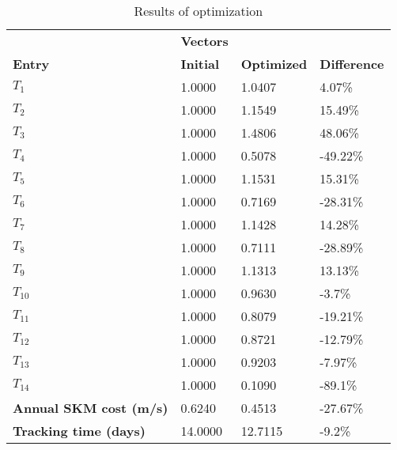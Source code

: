 \begin{table}[H]
\centering
\begin{tabular}{llll}
\textbf{}      & \cellcolor[HTML]{EFEFEF}\textbf{Vectors} & \textbf{} & \textbf{}         \\
\rowcolor[HTML]{EFEFEF} 
\textbf{Entry} & \textbf{Initial} & \textbf{Optimized} & \textbf{Difference} \\
$T_1$ & 1.0000 & 1.0407 & 4.07\% \\ 
$T_2$ & 1.0000 & 1.1549 & 15.49\% \\ 
$T_3$ & 1.0000 & 1.4806 & 48.06\% \\ 
$T_4$ & 1.0000 & 0.5078 & -49.22\% \\ 
$T_5$ & 1.0000 & 1.1531 & 15.31\% \\ 
$T_6$ & 1.0000 & 0.7169 & -28.31\% \\ 
$T_7$ & 1.0000 & 1.1428 & 14.28\% \\ 
$T_8$ & 1.0000 & 0.7111 & -28.89\% \\ 
$T_9$ & 1.0000 & 1.1313 & 13.13\% \\ 
$T_10$ & 1.0000 & 0.9630 & -3.7\% \\ 
$T_11$ & 1.0000 & 0.8079 & -19.21\% \\ 
$T_12$ & 1.0000 & 0.8721 & -12.79\% \\ 
$T_13$ & 1.0000 & 0.9203 & -7.97\% \\ 
$T_14$ & 1.0000 & 0.1090 & -89.1\% \\ 
\rowcolor[HTML]{EFEFEF} 
\textbf{Annual SKM cost (m/s)}  & 0.6240 & 0.4513 & -27.67\% \\ 
\rowcolor[HTML]{EFEFEF} 
\textbf{Tracking time (days)}  & 14.0000 & 12.7115 & -9.2\% \\ 
\end{tabular}
\caption{Results of optimization}
\label{tab:OptimizationAnalysis}
\end{table}